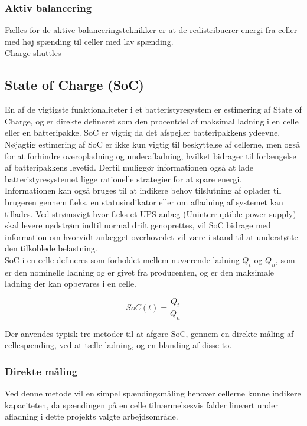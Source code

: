 \subsubsection{Aktiv balancering}
Fælles for de aktive balanceringsteknikker er at de redistribuerer energi fra celler med høj spænding til celler med lav spænding.
\\

Charge shuttles

\subsection{State of Charge (SoC)}
En af de vigtigste funktionaliteter i et batteristyresystem er estimering af State of Charge, og er direkte defineret som den procentdel af maksimal ladning i en celle eller en batteripakke. SoC er vigtig da det afspejler batteripakkens ydeevne. Nøjagtig estimering af SoC er ikke kun vigtig til beskyttelse af cellerne, men også for at forhindre overopladning og underafladning, hvilket bidrager til forlængelse af batteripakkens levetid. Dertil muliggør informationen også at lade batteristyresystemet ligge rationelle strategier for at spare energi.
\\
Informationen kan også bruges til at indikere behov tilslutning af oplader til brugeren gennem f.eks. en statusindikator eller om afladning af systemet kan tillades. 
Ved strømsvigt hvor f.eks et UPS-anlæg (Uninterruptible power supply) skal levere nødstrøm indtil normal drift genoprettes, vil SoC bidrage med information om hvorvidt anlægget overhovedet vil være i stand til at understøtte den tilkoblede belastning.
\\

SoC i en celle defineres som forholdet mellem nuværende ladning $Q_{t}$ og $Q_{n}$, som er den nominelle ladning og er givet fra producenten, og er den maksimale ladning der kan opbevares i en celle.

\begin {equation} 
SoC(t) = \frac{Q_t}{Q_n} \label{eq:soc}
\end {equation}

Der anvendes typisk tre metoder til at afgøre SoC, gennem en direkte måling af cellespænding, ved at tælle ladning, og en blanding af disse to.

\subsubsection{Direkte måling}
Ved denne metode vil en simpel spændingsmåling henover cellerne kunne indikere kapaciteten, da spændingen på en celle tilnærmelsesvis falder lineært under afladning i dette projekts valgte arbejdsområde.

